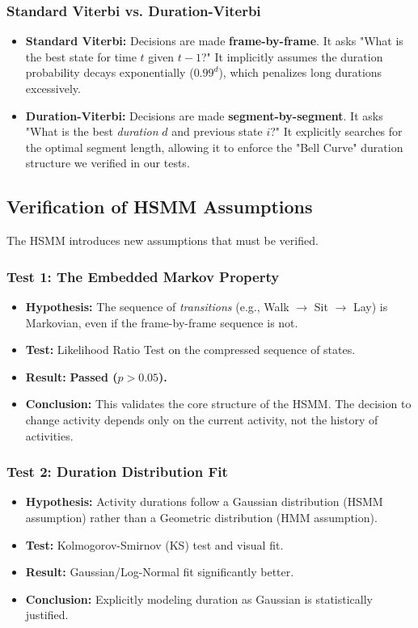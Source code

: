 \documentclass[11pt,a4paper]{article}
\begin{document}
\subsubsection{Standard Viterbi vs. Duration-Viterbi}
\begin{itemize}
    \item \textbf{Standard Viterbi:} Decisions are made \textbf{frame-by-frame}. It asks "What is the best state for time $t$ given $t-1$?" It implicitly assumes the duration probability decays exponentially ($0.99^d$), which penalizes long durations excessively.
    \item \textbf{Duration-Viterbi:} Decisions are made \textbf{segment-by-segment}. It asks "What is the best \textit{duration} $d$ and previous state $i$?" It explicitly searches for the optimal segment length, allowing it to enforce the "Bell Curve" duration structure we verified in our tests.
\end{itemize}

\subsection{Verification of HSMM Assumptions}
The HSMM introduces new assumptions that must be verified.

\subsubsection{Test 1: The Embedded Markov Property}
\begin{itemize}
    \item \textbf{Hypothesis:} The sequence of \textit{transitions} (e.g., Walk $\to$ Sit $\to$ Lay) is Markovian, even if the frame-by-frame sequence is not.
    \item \textbf{Test:} Likelihood Ratio Test on the compressed sequence of states.
    \item \textbf{Result:} \textbf{Passed ($p > 0.05$).}
    \item \textbf{Conclusion:} This validates the core structure of the HSMM. The decision to change activity depends only on the current activity, not the history of activities.
\end{itemize}

\subsubsection{Test 2: Duration Distribution Fit}
\begin{itemize}
    \item \textbf{Hypothesis:} Activity durations follow a Gaussian distribution (HSMM assumption) rather than a Geometric distribution (HMM assumption).
    \item \textbf{Test:} Kolmogorov-Smirnov (KS) test and visual fit.
    \item \textbf{Result:} Gaussian/Log-Normal fit significantly better.
    \item \textbf{Conclusion:} Explicitly modeling duration as Gaussian is statistically justified.
\end{itemize}
\end{document}
